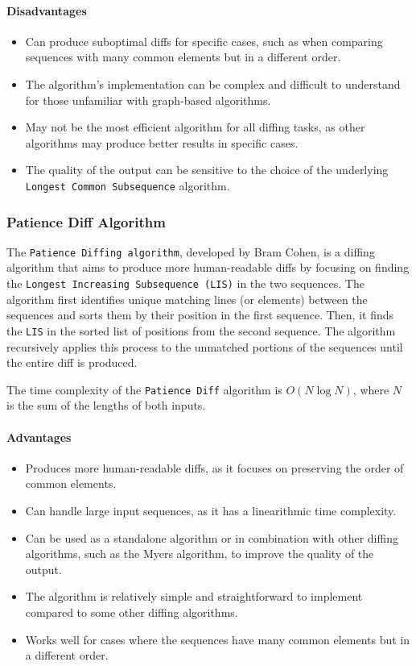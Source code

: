\paragraph{Disadvantages}
\begin{itemize}
    \item Can produce suboptimal diffs for specific cases, such as when comparing sequences with many common elements but in a different order.
    \item The algorithm's implementation can be complex and difficult to understand for those unfamiliar with graph-based algorithms.
    \item May not be the most efficient algorithm for all diffing tasks, as other algorithms may produce better results in specific cases.
    \item The quality of the output can be sensitive to the choice of the underlying \lstinline{Longest Common Subsequence} algorithm.
\end{itemize}

\subsubsection{Patience Diff Algorithm}
The \lstinline{Patience Diffing algorithm}, developed by Bram Cohen, is a diffing algorithm that aims to produce more human-readable diffs by focusing on finding the \lstinline{Longest Increasing Subsequence (LIS)} in the two sequences. The algorithm first identifies unique matching lines (or elements) between the sequences and sorts them by their position in the first sequence. Then, it finds the \lstinline{LIS} in the sorted list of positions from the second sequence. The algorithm recursively applies this process to the unmatched portions of the sequences until the entire diff is produced.
\smallskip

The time complexity of the \lstinline{Patience Diff} algorithm is $O(N\log N)$, where $N$ is the sum of the lengths of both inputs.


\paragraph{Advantages}
\begin{itemize}
    \item Produces more human-readable diffs, as it focuses on preserving the order of common elements.
    \item Can handle large input sequences, as it has a linearithmic time complexity.
    \item Can be used as a standalone algorithm or in combination with other diffing algorithms, such as the Myers algorithm, to improve the quality of the output.
    \item The algorithm is relatively simple and straightforward to implement compared to some other diffing algorithms.
    \item Works well for cases where the sequences have many common elements but in a different order.
\end{itemize}
